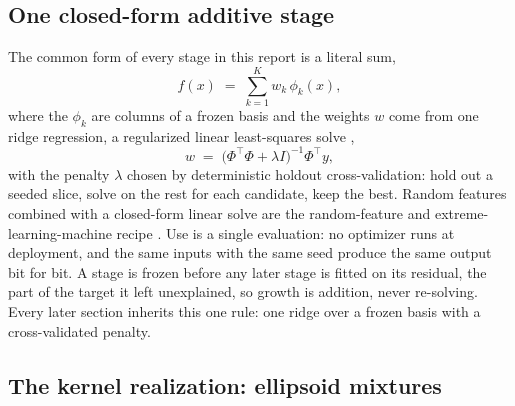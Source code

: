 \documentclass[11pt]{article}
\begin{document}
\subsection{One closed-form additive stage}

The common form of every stage in this report is a literal sum,
\begin{equation}
f(x) \;=\; \sum_{k=1}^{K} w_k\,\phi_k(x),
\label{eq:stage}
\end{equation}
where the $\phi_k$ are columns of a frozen basis and the weights
$w$ come from one ridge regression, a regularized linear
least-squares solve \cite{hoerl1970},
\begin{equation}
w \;=\; \bigl(\Phi^\top \Phi + \lambda I\bigr)^{-1} \Phi^\top y,
\label{eq:ridge}
\end{equation}
with the penalty $\lambda$ chosen by deterministic holdout
cross-validation: hold out a seeded slice, solve on the rest for
each candidate, keep the best. Random features combined with a
closed-form linear solve are the random-feature and
extreme-learning-machine recipe \cite{rahimi2007, cho2026}. Use
is a single evaluation: no optimizer runs at deployment, and the
same inputs with the same seed produce the same output bit for
bit. A stage is frozen before any later stage is fitted on its
residual, the part of the target it left unexplained, so growth is
addition, never re-solving. Every later section inherits this one
rule: one ridge over a frozen basis with a cross-validated
penalty.

\subsection{The kernel realization: ellipsoid mixtures}
\end{document}
